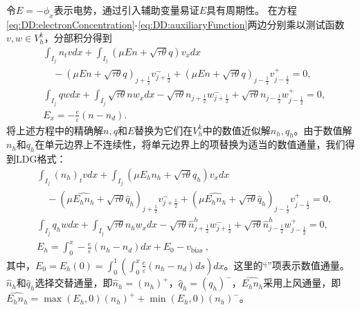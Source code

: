 令$E = -\phi_x$表示电势，通过引入辅助变量易证$E$具有周期性\cite{liu2010error}。
在方程\eqref{eq:DD:electronConcentration}-\eqref{eq:DD:auxiliaryFunction}两边分别乘以测试函数$v,w\in V_h^k$，分部积分得到
\begin{align}
     & \int_{I_{j}} n_{t} v d x+\int_{I_{j}}(\mu E n+\sqrt{\tau \theta} q) v_{x} d x                                                                               \nonumber                                      \\
     & \quad-(\mu E n+\sqrt{\tau \theta} q)_{j+\frac{1}{2}} v_{j+\frac{1}{2}}^{-}+(\mu E n+\sqrt{\tau \theta} q)_{j-\frac{1}{2}} v_{j-\frac{1}{2}}^{+}=0,            \label{eq:LDG:n}                             \\
     & \int_{I_{j}} q w d x+\int_{I_{j}} \sqrt{\tau \theta} n w_{x} d x-\sqrt{\tau \theta} n_{j+\frac{1}{2}} w_{j+\frac{1}{2}}^{-}+\sqrt{\tau \theta} n_{j-\frac{1}{2}} w_{j-\frac{1}{2}}^{+}=0, \label{eq:LDG:q} \\
     & E_{x}=-\frac{e}{\varepsilon}\left(n-n_{d}\right) .
\end{align}
将上述方程中的精确解$n, q$和$E$替换为它们在$V_{h}^{k}$中的数值近似解$n_h, q_h$。由于数值解$n_h$和$q_h$在单元边界上不连续性，将单元边界上的项替换为适当的数值通量，我们得到LDG格式：
\begin{align}
     & \int_{I_{j}}\left(n_h\right)_{t} v d x+\int_{I_{j}}\left(\mu E_h n_h+\sqrt{\tau \theta} q_h\right) v_{x} d x      \nonumber                                                                                                                    \\
     & \quad-\left(\mu \widehat{E_h n_h}+\sqrt{\tau \theta} \hat{q}_{h}\right)_{j+\frac{1}{2}} v_{j+\frac{1}{2}}^{-}+\left(\mu \widehat{E_h n_h}+\sqrt{\tau \theta} \hat{q}_{h}\right)_{j-\frac{1}{2}} v_{j-\frac{1}{2}}^{+}=0, \label{eq:DDLDGn}     \\
     & \int_{I_{j}} q_h w d x+\int_{I_{j}} \sqrt{\tau \theta} n_h w_{x} d x-\sqrt{\tau \theta} \hat{n}_{j+\frac{1}{2}}^{h} w_{j+\frac{1}{2}}^{-}+\sqrt{\tau \theta} \hat{n}_{j-\frac{1}{2}}^{h} w_{j-\frac{1}{2}}^{+}=0,            \label{eq:DDLDGq} \\
     & E_h=\int_{0}^{x}-\frac{e}{\varepsilon}\left(n_h-n_{d}\right) d x+E_{0}-v_{\text {bias }},\label{eq:DDLDGE}
\end{align}
其中，$E_{0}=E_h(0)=\int_{0}^{1}\left(\int_{0}^{x} \frac{e}{\varepsilon}\left(n_h-n_{d}\right) d s\right) d x$。这里的“$\hat{}$”项表示数值通量。$\hat{n}_{h}$和$\hat{q}_{h}$选择交替通量，即$\hat{n}_{h}=\left(n_h\right)^{+}$，$\hat{q}_{h}=\left(q_h\right)^{-}$，$\widehat{E_h n_h}$采用上风通量，即$\widehat{E_h n_h}=\max \left(E_h, 0\right)\left(n_h\right)^{+}+\min \left(E_h, 0\right)\left(n_h\right)^{-}$。

